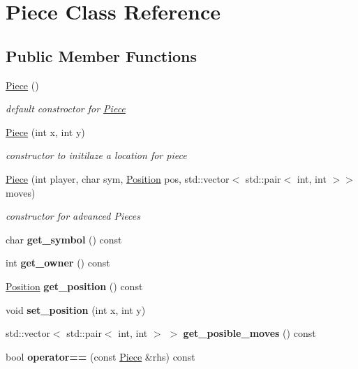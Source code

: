 \hypertarget{class_piece}{}\section{Piece Class Reference}
\label{class_piece}
\subsection*{Public Member Functions}
\begin{DoxyCompactItemize}
\item 
\hyperlink{class_piece_ac57de5803bbad829b143bc7268267dc1}{Piece} ()
\begin{DoxyCompactList}\small\item\em default constroctor for \hyperlink{class_piece}{Piece} \end{DoxyCompactList}\item 
\hyperlink{class_piece_af1d9eb7f67a06fd1dec6c990c95b5801}{Piece} (int x, int y)
\begin{DoxyCompactList}\small\item\em constructor to initilaze a location for piece \end{DoxyCompactList}\item 
\hyperlink{class_piece_a14670dac899c8c3ea9efe5e11a87fd85}{Piece} (int player, char sym, \hyperlink{struct_position}{Position} pos, std\+::vector$<$ std\+::pair$<$ int, int $>$$>$ moves)
\begin{DoxyCompactList}\small\item\em constructor for advanced Pieces \end{DoxyCompactList}\item 
\mbox{\label{class_piece_ad0eb90d1f75a909240d98ed70d72e4f4}} 
char {\bfseries get\+\_\+symbol} () const
\item 
\mbox{\label{class_piece_ab588439a98647b6b6deef620be16e7ae}} 
int {\bfseries get\+\_\+owner} () const
\item 
\mbox{\label{class_piece_a6dcc7df628eb1f8317caaa4970835517}} 
\hyperlink{struct_position}{Position} {\bfseries get\+\_\+position} () const
\item 
\mbox{\label{class_piece_a20bfbba13742685ede3fbde882f9cbf5}} 
void {\bfseries set\+\_\+position} (int x, int y)
\item 
\mbox{\label{class_piece_a328672e36bcdd76b0ea1892e3a733bda}} 
std\+::vector$<$ std\+::pair$<$ int, int $>$ $>$ {\bfseries get\+\_\+posible\+\_\+moves} () const
\item 
\mbox{\label{class_piece_a874649d960a257b6fa24baa3319fb5e8}} 
bool {\bfseries operator==} (const \hyperlink{class_piece}{Piece} \&rhs) const
\end{DoxyCompactItemize}


